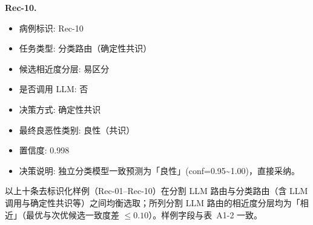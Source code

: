 \noindent\textbf{Rec-10.}\par
\begin{itemize}[leftmargin=1.5em,topsep=0.1em,itemsep=0.05em]
\item 病例标识: Rec-10
\item 任务类型: 分类路由（确定性共识）
\item 候选相近度分层: 易区分
\item 是否调用 LLM: 否
\item 决策方式: 确定性共识
\item 最终良恶性类别: 良性（共识）
\item 置信度: 0.998
\item 决策说明: 独立分类模型一致预测为「良性」(conf=0.95\textasciitilde{}1.00)，直接采纳。
\end{itemize}
\par\smallskip\noindent\footnotesize 以上十条去标识化样例（Rec-01--Rec-10）在分割 LLM 路由与分类路由（含 LLM 调用与确定性共识等）之间均衡选取；所列分割 LLM 路由的相近度分层均为「相近」（最优与次优候选一致度差 $\leq 0.10$）。样例字段与表~A1-2 一致。
